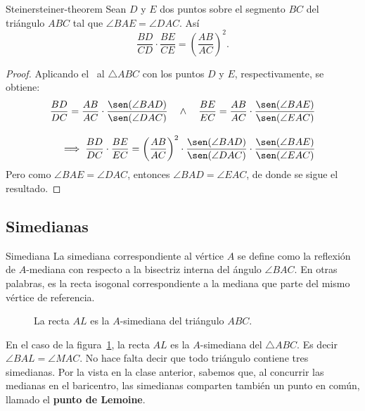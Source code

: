 \begin{section-theorem.tcb}{Steiner}{steiner-theorem}
    Sean $D$ y $E$ dos puntos sobre el segmento $BC$ del triángulo $ABC$ tal que $\angle BAE = \angle DAC$.
    Así
    \[
        \frac{BD}{CD} \cdot \frac{BE}{CE} = \left(\frac{AB}{AC}\right)^2.
    \]
\end{section-theorem.tcb}

\begin{figure}[H]
    \centering
    
\end{figure}

\begin{proof}
    Aplicando el~ al $\triangle ABC$ con los puntos $D$ y $E$, respectivamente, se obtiene:
    \begin{align*}
        \frac{BD}{DC} = \frac{AB}{AC} \cdot \frac{\sen(\angle BAD)}{\sen(\angle DAC)} \quad \land \quad
        \frac{BE}{EC} = \frac{AB}{AC} \cdot \frac{\sen(\angle BAE)}{\sen(\angle EAC)} \\[3mm]
        \implies \frac{BD}{DC} \cdot \frac{BE}{EC} = \left(\frac{AB}{AC}\right)^2 \cdot \frac{\sen(\angle BAD)}{\sen(\angle DAC)} \cdot \frac{\sen(\angle BAE)}{\sen(\angle EAC)}
    \end{align*}
    Pero como $\angle BAE = \angle DAC$, entonces $\angle BAD = \angle EAC$, de donde se sigue el resultado.
\end{proof}


\subsection{Simedianas}

\begin{section-definition.tcb}{Simediana}{}
    La simediana correspondiente al vértice $A$ se define como la reflexión de $A$\nobreakdash-mediana con respecto a la bisectriz interna del ángulo $\angle BAC$.
    En otras palabras, es la recta isogonal correspondiente a la mediana que parte del mismo vértice de referencia.
\end{section-definition.tcb}

\begin{figure}[H]
    \centering
    
    \caption{La recta $AL$ es la $A$-simediana del triángulo $ABC$.}
    \label{fig:symmedian-definition}
\end{figure}

En el caso de la figura~\ref{fig:symmedian-definition}, la recta $AL$ es la $A$-simediana del $\triangle ABC$.
Es decir $\angle BAL = \angle MAC$.
No hace falta decir que todo triángulo contiene tres simedianas.
Por la  vista en la clase anterior, sabemos que, al concurrir las medianas en el baricentro, las simedianas comparten también un punto en común, llamado el \textbf{punto de Lemoine}.


